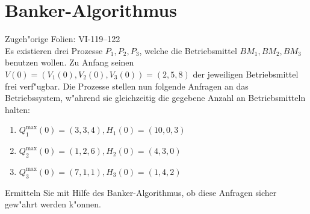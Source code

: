 \section{Banker-Algorithmus}

Zugeh"orige Folien: VI-119--122 \\

Es existieren drei Prozesse $P_1, P_2, P_3$, welche die Betriebsmittel
$BM_1, BM_2, BM_3$ benutzen wollen.  Zu Anfang seinen $V(0) = (V_1(0),
V_2(0), V_3(0)) = (2, 5, 8)$ der jeweiligen Betriebsmittel frei
verf"ugbar.  Die Prozesse stellen nun folgende Anfragen an das
Betriebssystem, w"ahrend sie gleichzeitig die gegebene Anzahl an
Betriebsmitteln halten:

\begin{enumerate}
\item $Q_1^\text{max}(0) = (3, 3, 4), H_1(0) = (10, 0, 3)$
\item $Q_2^\text{max}(0) = (1, 2, 6), H_2(0) = (4, 3, 0)$
\item $Q_3^\text{max}(0) = (7, 1, 1), H_3(0) = (1, 4, 2)$
\end{enumerate}

Ermitteln Sie mit Hilfe des Banker-Algorithmus, ob diese Anfragen
sicher gew"ahrt werden k"onnen.
